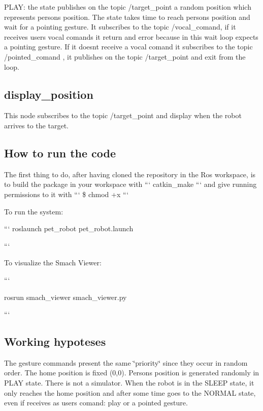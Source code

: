 P\+L\+AY\+: the state publishes on the topic \textquotesingle{}/target\+\_\+point\textquotesingle{} a random position which represents person\textquotesingle{}s position. The state takes time to reach person\textquotesingle{}s position and wait for a pointing gesture. It subscribes to the topic \textquotesingle{}/vocal\+\_\+comand\textquotesingle{}, if it receives user\textquotesingle{}s vocal comands it return and error because in this wait loop expects a pointing gesture. If it doesn\textquotesingle{}t receive a vocal comand it subscribes to the topic \textquotesingle{}/pointed\+\_\+comand\textquotesingle{} , it publishes on the topic \textquotesingle{}/target\+\_\+point\textquotesingle{} and exit from the loop.

\subsection*{display\+\_\+position}

This node subscribes to the topic \textquotesingle{}/target\+\_\+point\textquotesingle{} and display when the robot arrives to the target.

\subsection*{How to run the code}

The first thing to do, after having cloned the repository in the Ros workspace, is to build the package in your workspace with ``` catkin\+\_\+make ``` and give running permissions to it with ``` \$ chmod +x ```

To run the system\+: \begin{DoxyVerb}```
roslaunch pet_robot pet_robot.launch

```
\end{DoxyVerb}
 To visualize the Smach Viewer\+: \begin{DoxyVerb}```
\end{DoxyVerb}
 rosrun smach\+\_\+viewer smach\+\_\+viewer.\+py

```

\subsection*{Working hypoteses}

The gesture commands present the same \char`\"{}priority\char`\"{} since they occur in random order. The home position is fixed (0,0). Person\textquotesingle{}s position is generated randomly in \textquotesingle{}P\+L\+AY\textquotesingle{} state. There is not a simulator. When the robot is in the \textquotesingle{}S\+L\+E\+EP\textquotesingle{} state, it only reaches the home position and after some time goes to the \textquotesingle{}N\+O\+R\+M\+AL\textquotesingle{} state, even if receives as user\textquotesingle{}s comand\+: \textquotesingle{}play\textquotesingle{} or a pointed gesture.

